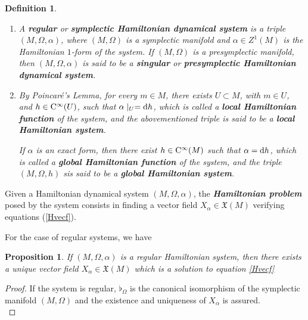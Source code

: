 \documentclass[12pt]{report}
\newtheorem{prop}[teor]{Proposition}
\newtheorem{definition}[teor]{Definition}
\def\qed{\ifvmode\removelastskip\fi
{\unskip\nobreak\hfil\penalty50\hbox{}\nobreak\hfil
\hbox{\vrule height1.2ex width1.2ex}\parfillskip=0pt
\finalhyphendemerits=0 \par\smallskip}}
\def\vf{\mathfrak X}
\def\d{{\rm d}}
\def\Cinfty{{\rm C}^\infty}
\begin{document}
\begin{definition}
\begin{enumerate}
\item
A \textbf{regular} or \textbf{symplectic Hamiltonian dynamical system}
is a triple $(M,\Omega ,\alpha )$,
where $(M,\Omega )$ is a symplectic manifold 
and $\alpha \in Z^1 (M)$ is the Hamiltonian $1$-form of the system.
If $(M,\Omega )$ is a presymplectic manifold, then $(M,\Omega ,\alpha )$
is said to be a \textbf{singular} or \textbf{presymplectic Hamiltonian dynamical system}.
\item
By Poincar\'e's Lemma, for every $m \in M$, 
there exists $U \subset M$, with $m\in U$,
and $h \in \Cinfty (U)$, such that $\alpha\mid_U = \d h$,
which is called a \textbf{local Hamiltonian function} of the system,
and the abovementioned triple is said to be a
\textbf{local Hamiltonian system}.

If $\alpha$ is an exact form, then there exist 
$h \in \Cinfty (M)$ such that $\alpha = \d h$,
which is called a \textbf{global Hamiltonian function} of the system,
and the triple $(M,\Omega ,h)$ sis said to be a
\textbf{global Hamiltonian system}.
\end{enumerate}
\label{sdhr}
\end{definition}

Given a Hamiltonian dynamical system $(M,\Omega,\alpha)$, 
the {\sl \textbf{Hamiltonian problem}} posed by  the system
consists in finding a vector field $X_\alpha \in \vf (M)$
verifying  equations (\ref{Hvecf}).

For the case of regular systems, we have

\begin{prop}
\label{teo-hameqs}
If $(M,\Omega,\alpha)$ is a regular Hamiltonian system, 
then there exists a unique vector field $X_\alpha\in\vf(M)$ which is a solution to equation  \eqref{Hvecf}
\end{prop}
\begin{proof}
If the system is regular, $\flat_\Omega$ is the canonical  isomorphism of
the symplectic manifold $(M,\Omega)$ and
the existence and  uniqueness of $X_\alpha$ is assured.
\\ \qed  \end{proof}
\end{document}

